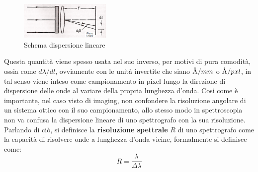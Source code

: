 \begin{figure}
    \centering
    \vspace{-10pt}
    \includegraphics[width=0.39\textwidth]{Immagini/Capitolo3/Spettroscopia_schema_dispersione_lineare.PNG}
    \caption*{Schema dispersione lineare}
    \vspace{-10pt}
\end{figure}

Questa quantità viene spesso usata nel suo inverso, per motivi di pura comodità, ossia come $d\lambda/dl$, ovviamente con le unità invertite che siano $\mbox{\normalfont\AA}/mm$ o $\mbox{\normalfont\AA}/pxl$, in tal senso viene inteso come campionamento in pixel lungo la direzione di dispersione delle onde al variare della propria lunghezza d'onda. Così come è importante, nel caso visto di imaging, non confondere la risoluzione angolare di un sistema ottico con il suo campionamento, allo stesso modo in spettroscopia non va confusa la dispersione lineare di uno spettrografo con la sua risoluzione. Parlando di ciò, si definisce la \textbf{risoluzione spettrale} $R$ di uno spettrografo come la capacità di risolvere onde a lunghezza d'onda vicine, formalmente si definisce come:
\begin{equation}
    \label{def:risoluzione-spettrale}
    R = \frac{\lambda}{\Delta\lambda}
\end{equation}